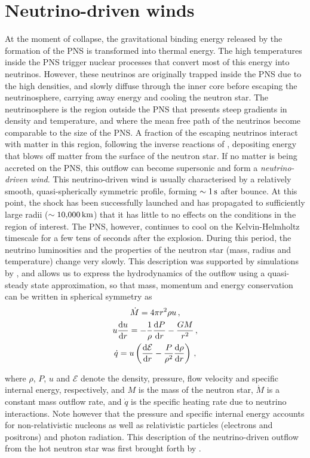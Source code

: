 \section{Neutrino-driven winds} \label{sec:ndw}

At the moment of collapse, the gravitational binding energy released by the formation of the PNS is transformed into thermal energy. The high temperatures inside the PNS trigger nuclear processes that convert most of this energy into neutrinos. However, these neutrinos are originally trapped inside the PNS due to the high densities, and slowly diffuse through the inner core before escaping the neutrinosphere, carrying away energy and cooling the neutron star. The neutrinosphere is the region outside the PNS that presents steep gradients in density and temperature, and where the mean free path of the neutrinos become comparable to the size of the PNS. A fraction of the escaping neutrinos interact with matter in this region, following the inverse reactions of , depositing energy that blows off matter from the surface of the neutron star. If no matter is being accreted on the PNS, this outflow can become supersonic and form a \emph{neutrino-driven wind}. This neutrino-driven wind is usually characterised by a relatively smooth, quasi-spherically symmetric profile, forming \(\sim1\,\mathrm{s}\) after bounce. At this point, the shock has been successfully launched and has propagated to sufficiently large radii (\(\sim10{,}000\,\mathrm{km}\)) that it has little to no effects on the conditions in the region of interest. The PNS, however, continues to cool on the Kelvin-Helmholtz timescale for a few tens of seconds after the explosion. During this period, the neutrino luminosities and the properties of the neutron star (mass, radius and temperature) change very slowly. This description was supported by simulations by \cite{Janka1995}, and allows us to express the hydrodynamics of the outflow using a quasi-steady state approximation, so that mass, momentum and energy conservation can be written in spherical symmetry as
\begin{gather}
    \dot{M} = 4 \pi r^2 \rho u \,\mathrm{,} \\
    u \frac{\mathrm{d}\mathrm{} u}{\mathrm{d}\mathrm{} r} = - \frac{1}{\rho} \frac{\mathrm{d}\mathrm{} P}{\mathrm{d}\mathrm{} r} - \frac{GM}{r^2} \,\mathrm{,} \\
    \dot{q} = u \left( \frac{\mathrm{d}\mathrm{} \mathcal{E}}{\mathrm{d}\mathrm{} r} - \frac{P}{\rho^2} \frac{\mathrm{d}\mathrm{} \rho}{\mathrm{d}\mathrm{} r} \right) \,\mathrm{,}
\end{gather}

where \(\rho\), \(P\), \(u\) and \(\mathcal{E}\) denote the density, pressure, flow velocity and specific internal energy, respectively, and \(M\) is the mass of the neutron star, \(\dot{M}\) is a constant mass outflow rate, and \(\dot{q}\) is the specific heating rate due to neutrino interactions. Note however that the pressure and specific internal energy accounts for non-relativistic nucleons as well as relativistic particles (electrons and positrons) and photon radiation. This description of the neutrino-driven outflow from the hot neutron star was first brought forth by \cite{Duncan1986}.

